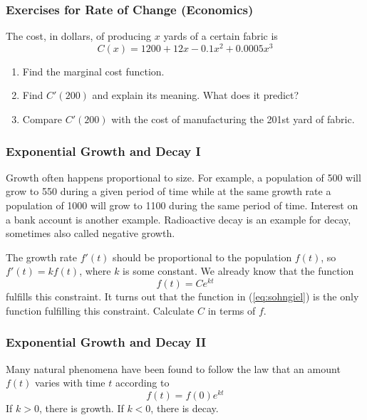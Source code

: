 \documentclass[xcolor=dvipsnames]{beamer}
\begin{document}
\begin{frame}
  \frametitle{Exercises for Rate of Change (Economics)}
The cost, in dollars, of producing $x$ yards of a certain fabric is
\begin{equation}
  \label{eq:uquuthae}
  C(x)=1200+12x-0.1x^{2}+0.0005x^{3}
\end{equation}
\begin{enumerate}
\item<1-> Find the marginal cost function.
\item<2-> Find $C'(200)$ and explain its meaning. What does it
  predict?
\item<3-> Compare $C'(200)$ with the cost of manufacturing the 201st
  yard of fabric.
\end{enumerate}
\end{frame}

\begin{frame}
  \frametitle{Exponential Growth and Decay I}
  Growth often happens proportional to size. For example, a population
  of 500 will grow to 550 during a given period of time while at the
  same growth rate a population of 1000 will grow to 1100 during the
  same period of time. Interest on a bank account is another example.
  Radioactive decay is an example for decay, sometimes also called
  negative growth. 

\bigskip

The growth rate $f'(t)$ should be proportional to the population
$f(t)$, so $f'(t)=kf(t)$, where $k$ is some constant. We already know
that the function
\begin{equation}
  \label{eq:sohngiel}
  f(t)=Ce^{kt}
\end{equation}
fulfills this constraint. It turns out that the function in
(\ref{eq:sohngiel}) is the only function fulfilling this constraint.
Calculate $C$ in terms of $f$.
\end{frame}

\begin{frame}
  \frametitle{Exponential Growth and Decay II}
Many natural phenomena have been found to follow the law that an
amount $f(t)$ varies with time $t$ according to
  \begin{equation}
    \label{eq:lauwutho}
    f(t)=f(0)e^{kt}
  \end{equation}
If $k>0$, there is growth. If $k<0$, there is decay.
\end{frame}
\end{document}

